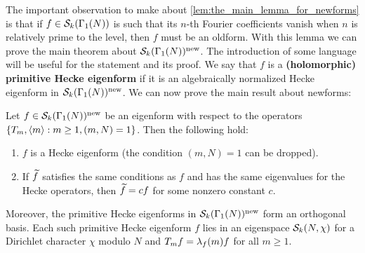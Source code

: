       The important observation to make about \cref{lem:the_main_lemma_for_newforms} is that if $f \in \mathcal{S}_{k}(\Gamma_{1}(N))$ is such that its $n$-th Fourier coefficients vanish when $n$ is relatively prime to the level, then $f$ must be an oldform. With this lemma we can prove the main theorem about $\mathcal{S}_{k}(\Gamma_{1}(N))^{\mathrm{new}}$. The introduction of some language will be useful for the statement and its proof. We say that $f$ is a \textbf{(holomorphic) primitive Hecke eigenform} if it is an algebraically normalized Hecke eigenform in $\mathcal{S}_{k}(\Gamma_{1}(N))^{\mathrm{new}}$. We can now prove the main result about newforms:

      \begin{theorem}\label{thm:newforms_characterization}
        Let $f \in \mathcal{S}_{k}(\Gamma_{1}(N))^{\mathrm{new}}$ be an eigenform with respect to the operators $\{T_{m},\langle m\rangle:m \ge 1, (m,N) = 1\}$. Then the following hold:
        \begin{enumerate}[label=(\roman*)]
          \item $f$ is a Hecke eigenform (the condition $(m,N) = 1$ can be dropped).
          \item If $\widetilde{f}$ satisfies the same conditions as $f$ and has the same eigenvalues for the Hecke operators, then $\widetilde{f} = cf$ for some nonzero constant $c$.
        \end{enumerate}
        Moreover, the primitive Hecke eigenforms in $\mathcal{S}_{k}(\Gamma_{1}(N))^{\mathrm{new}}$ form an orthogonal basis. Each such primitive Hecke eigenform $f$ lies in an eigenspace $\mathcal{S}_{k}(N,\chi)$ for a Dirichlet character $\chi$ modulo $N$ and $T_{m}f = \lambda_{f}(m)f$ for all $m \ge 1$.
      \end{theorem}
